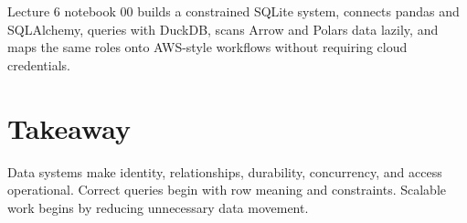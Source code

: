 \begin{notebooklink}
Lecture 6 notebook 00 builds a constrained SQLite system, connects pandas and
SQLAlchemy, queries with DuckDB, scans Arrow and Polars data lazily, and maps the
same roles onto AWS-style workflows without requiring cloud credentials.
\end{notebooklink}

\section{Takeaway}

Data systems make identity, relationships, durability, concurrency, and access
operational. Correct queries begin with row meaning and constraints. Scalable
work begins by reducing unnecessary data movement.
